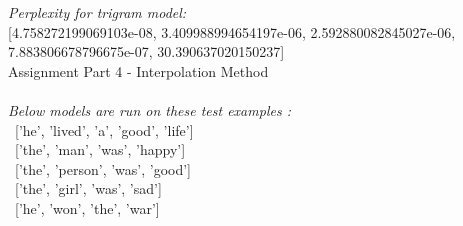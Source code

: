 \documentclass[11ppt]{article}
\begin{document}
\textit{Perplexity for trigram model:} \\ \vspace{1mm}  [4.758272199069103e-08, 3.409988994654197e-06, 2.592880082845027e-06, 7.883806678796675e-07, 30.390637020150237]  \\ 
\vspace{4mm}
{\rmfamily\mdseries\Large Assignment Part 4 - Interpolation Method}\\
\hrulefill \\
\vspace{3mm}
\textit{Below models are run on these test examples :} \\ 
\ ['he', 'lived', 'a', 'good', 'life'] \\
\ ['the', 'man', 'was', 'happy'] \\
\ ['the', 'person', 'was', 'good'] \\
\ ['the', 'girl', 'was', 'sad'] \\
\ ['he', 'won', 'the', 'war'] \\
\vspace{2mm}
\end{document}
